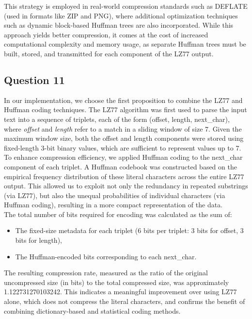 \documentclass[]{template}
\begin{document}
    \noindent
    This strategy is employed in real-world compression standards such as DEFLATE (used in formats like ZIP and PNG), 
    where additional optimization techniques such as dynamic block-based Huffman trees are also incorporated. 
    While this approach yields better compression, it comes at the cost of increased computational complexity and memory usage, 
    as separate Huffman trees must be built, stored, and transmitted for each component of the LZ77 output.

    \subsection{Question 11}

    In our implementation, we choose the first proposition to combine the LZ77 and Huffman coding techniques. 
    The LZ77 algorithm was first used to parse the input text into a sequence of triplets, 
    each of the form (offset, length, next\_char), where \textit{offset} and \textit{length} refer to a match 
    in a sliding window of size 7. 
    Given the maximum window size, both the offset and length components were stored using 
    fixed-length 3-bit binary values, which are sufficient to represent values up to 7.\\

    \noindent
    To enhance compression efficiency, we applied Huffman coding to the next\_char component of each triplet. 
    A Huffman codebook was constructed based on the empirical frequency distribution of these literal characters 
    across the entire LZ77 output. This allowed us to exploit not only the redundancy in repeated substrings (via LZ77), 
    but also the unequal probabilities of individual characters (via Huffman coding), resulting in a more compact representation of the data.\\

    \noindent
    The total number of bits required for encoding was calculated as the sum of:

    \begin{itemize}
        \item The fixed-size metadata for each triplet (6 bits per triplet: 3 bits for offset, 3 bits for length),
        \item The Huffman-encoded bits corresponding to each next\_char.
    \end{itemize}

    \noindent
    The resulting compression rate, measured as the ratio of the original uncompressed size (in bits) 
    to the total compressed size, was approximately 1.122731270103242. 
    This indicates a meaningful improvement over using LZ77 alone, which does not compress the literal 
    characters, and confirms the benefit of combining dictionary-based and statistical coding methods.
\end{document}
